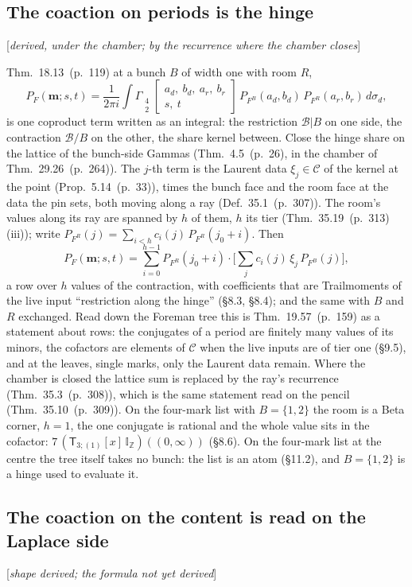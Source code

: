 \documentclass[11pt]{article}
\newcommand{\cB}{\mathcal B}
\newcommand{\mvec}{\mathbf m}
\newcommand{\sT}{\mathsf T}
\newcommand{\Gst}[4]{\Gamma_{\substack{#1\\#2}}\!\begin{bmatrix}#3\\#4\end{bmatrix}}
\newcommand{\IZ}{\mathbb I_{\mathbb Z}}
\newcommand{\Tx}[3]{(\sT_{#1;(1)}[x]\,#2)((#3,\infty))}
\newcommand{\status}[1]{\hfill{\small[\textit{#1}]}}
\newcommand{\hb}[2]{#1~(p.~#2)}   %
\theoremstyle{plain}
\theoremstyle{remark}
\begin{document}
\subsection{The coaction on periods is the hinge}\status{derived, under the chamber; by the recurrence where the chamber closes}

Thm.~\hb{18.13}{119} at a bunch $B$ of width one with room $R$,
\[
P_F(\mvec;s,t)=\frac1{2\pi i}\int\Gst42{a_d,\ b_d,\ a_r,\ b_r}{s,\ t}\,P_{F^B}(a_d,b_d)\,P_{F^R}(a_r,b_r)\,d\sigma_d,
\]
is one coproduct term written as an integral: the restriction $\cB|B$ on one side, the contraction $\cB/B$ on the other, the share kernel between. Close the hinge share on the lattice of the bunch-side Gammas (Thm.~\hb{4.5}{26}, in the chamber of Thm.~\hb{29.26}{264}). The $j$-th term is the Laurent data $\xi_j\in\mathcal C$ of the kernel at the point (Prop.~\hb{5.14}{33}), times the bunch face and the room face at the data the pin sets, both moving along a ray (Def.~\hb{35.1}{307}). The room's values along its ray are spanned by $h$ of them, $h$ its tier (Thm.~\hb{35.19}{313}(iii)); write $P_{F^R}(j)=\sum_{i<h}c_i(j)\,P_{F^R}(j_0+i)$. Then
\[
P_F(\mvec;s,t)=\sum_{i=0}^{h-1}P_{F^R}(j_0+i)\cdot\Big[\sum_{j}c_i(j)\,\xi_j\,P_{F^B}(j)\Big],
\]
a row over $h$ values of the contraction, with coefficients that are Trailmoments of the live input ``restriction along the hinge'' (\S8.3, \S8.4); and the same with $B$ and $R$ exchanged. Read down the Foreman tree this is Thm.~\hb{19.57}{159} as a statement about rows: the conjugates of a period are finitely many values of its minors, the cofactors are elements of $\mathcal C$ when the live inputs are of tier one (\S9.5), and at the leaves, single marks, only the Laurent data remain. Where the chamber is closed the lattice sum is replaced by the ray's recurrence (Thm.~\hb{35.3}{308}), which is the same statement read on the pencil (Thm.~\hb{35.10}{309}). On the four-mark list with $B=\{1,2\}$ the room is a Beta corner, $h=1$, the one conjugate is rational and the whole value sits in the cofactor: $7\,\Tx3{\IZ}0$ (\S8.6). On the four-mark list at the centre the tree itself takes no bunch: the list is an atom (\S11.2), and $B=\{1,2\}$ is a hinge used to evaluate it.

\subsection{The coaction on the content is read on the Laplace side}\status{shape derived; the formula not yet derived}
\end{document}
